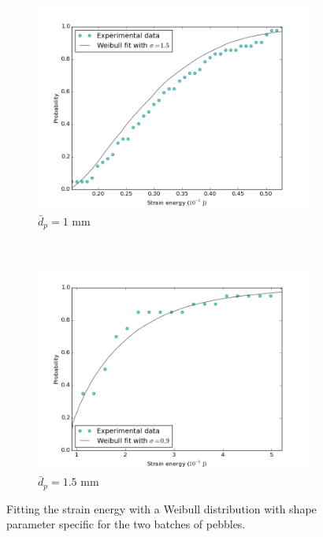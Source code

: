 \begin{figure}
        \centering
        \begin{subfigure}[b]{\doubleimagewidth}
                \includegraphics[width=\textwidth]{chapters/figures/nfri-1mm-w-cdf-fit.png}
                \caption{$\bar{d}_p = 1$ mm}
                \label{fig:nfri-1-w-cdf}
        \end{subfigure}
        ~
        \begin{subfigure}[b]{\doubleimagewidth}
                \includegraphics[width=\textwidth]{chapters/figures/nfri-1.5mm-w-cdf-fit.png}
                \caption{$\bar{d}_p = 1.5$ mm}
                \label{fig:nfri-1.5-w-cdf}
        \end{subfigure}
        \caption{Fitting the strain energy with a Weibull distribution with shape parameter specific for the two batches of \lit pebbles.}\label{fig:nfri-w-cdf}
\end{figure}

